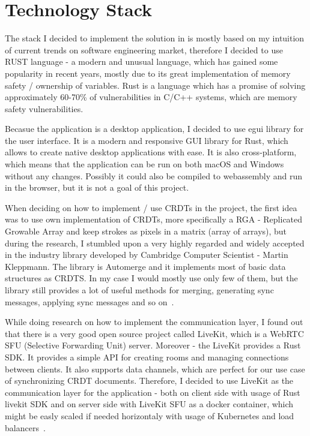 \documentclass[a4paper,11pt,twoside]{report}
\theoremstyle{definition}
\begin{document}
\section{Technology Stack}

The stack I decided to implement the solution in is mostly based on my intuition of current trends on software 
engineering market, therefore I decided to use RUST language - a modern and unusual language, which has gained 
some popularity in recent years, mostly due to its great implementation of memory safety / ownership of variables. 
Rust is a language which has a promise of solving approximately 60-70\% of vulnerabilities in C/C++ systems, which 
are memory safety vulnerabilities.

Becasue the application is a desktop application, I decided to use egui library for the user interface. It
 is a modern and responsive GUI library for Rust, which allows to create native desktop applications with ease. 
 It is also cross-platform, which means that the application can be run on both macOS and Windows without 
 any changes. Possibly it could also be compiled to webassembly and run in the browser, but it is not a goal of
  this project.

  When deciding on how to implement / use CRDTs in the project, the first idea was to use own implementation 
  of CRDTs, more specifically a RGA - Replicated Growable Array and keep strokes as pixels in a matrix (array of arrays), 
  but during the research, I stumbled upon a very highly regarded and widely accepted in the industry library developed 
  by Cambridge Computer Scientist - Martin Kleppmann. The library is Automerge and it implements most of
  basic data structures as CRDTS. In my case I would mostly use only few of them, 
  but the library still provides a lot of useful methods for merging, generating sync messages, applying sync messages and so on~\cite{automerge-docs}.

While doing research on how to implement the communication layer, I found out that
 there is a very good open 
source project called LiveKit, which is a WebRTC SFU (Selective Forwarding Unit) 
server. Moreover - the LiveKit provides a Rust SDK. 
It provides a simple API for creating rooms and managing connections between
 clients. It also supports data channels, which are perfect for our use case of
  synchronizing CRDT documents. 
 Therefore, I decided to use LiveKit as the communication layer for the application - 
 both on client side with usage of Rust livekit SDK and on server side with LiveKit SFU as 
 a docker container, which might be easly scaled if needed horizontaly with usage of Kubernetes 
 and load balancers~\cite{livekit-deployment}.
\end{document}
